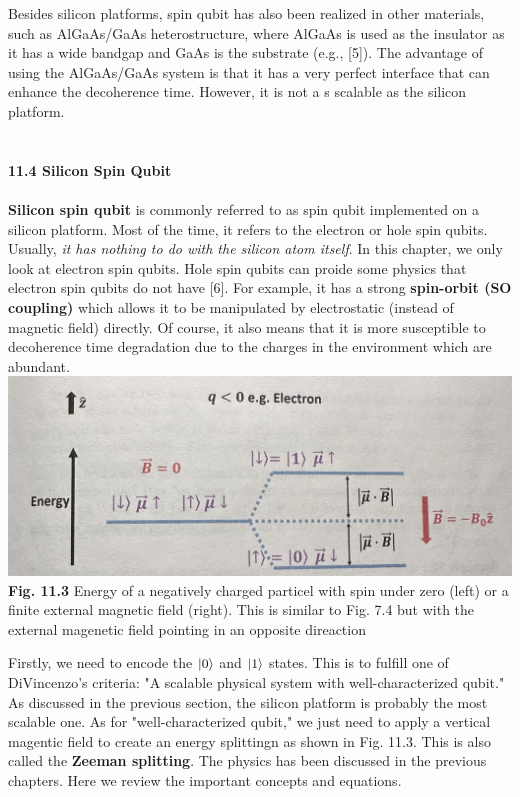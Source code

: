 \documentclass{article}
\begin{document}
Besides silicon platforms, spin qubit has also been realized in other materials, such as AlGaAs/GaAs heterostructure, 
where AlGaAs is used as the insulator as it has a wide bandgap and GaAs is the substrate (e.g., [5]).
The advantage of using the AlGaAs/GaAs system is that it has a very perfect interface that can enhance the decoherence time.
However, it is not a s scalable as the silicon platform.\\\\\\
\textbf{\large 11.4 Silicon Spin Qubit}\\\\
\textbf{Silicon spin qubit} is commonly referred to as spin qubit implemented on a silicon platform.
Most of the time, it refers to the electron or hole spin qubits. Usually, \textit{it has nothing to do
with the silicon atom itself}. In this chapter, we only look at electron spin qubits. Hole spin qubits can proide some
physics that electron spin qubits do not have [6]. For example, it has a strong \textbf{spin-orbit (SO coupling)} which allows
it to be manipulated by electrostatic (instead of magnetic field) directly. Of course, it also means
that it is more susceptible to decoherence time degradation due to the charges in the environment which are abundant.\\

\includegraphics[scale=0.45]{Fig.11.3.jpeg}\\
\textbf{Fig. 11.3} Energy of a negatively charged particel with spin under zero (left) or a finite external
magnetic field (right). This is similar to Fig. 7.4 but with the external magenetic field pointing in an opposite direaction

Firstly, we need to encode the $\ket{0}$ and $\ket{1}$ states. This is to fulfill one of 
DiVincenzo's criteria: "A scalable physical system with well-characterized qubit." As discussed 
in the previous section, the silicon platform is probably the most scalable one.
As for "well-characterized qubit," we just need to apply a vertical magentic field
to create an energy splittingn as shown in Fig. 11.3. This is also called the \textbf{Zeeman splitting}.
The physics has been discussed in the previous chapters. Here we review the important concepts and equations.
\end{document}
